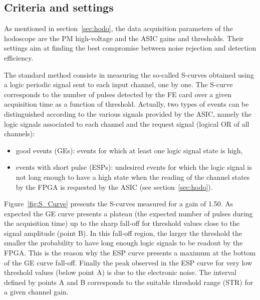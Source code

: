 \documentclass[a4paper,11pt]{article}
\begin{document}
\subsection{Criteria and settings}
\label{sec:Settings}

As mentioned in section~\ref{sec:hodo}, the data acquisition parameters of the hodoscope are the PM high-voltage and the ASIC gains and thresholds. Their settings aim at finding the best compromise between noise rejection and detection efficiency.

The standard method consists in measuring the so-called S-curves obtained using a logic periodic signal sent to each input channel, one by one. The S-curve corresponds to the number of pulses detected by the FE card over a given acquisition time as a function of threshold. Actually, two types of events can be distinguished according to the various signals provided by the ASIC, namely the logic signals associated to each channel and the request signal (logical OR of all channels):
\begin{itemize}
  \item good events (GEs): events for which at least one logic signal state is high, 
  \item events with short pulse (ESPs): undesired events for which the logic signal is not long enough to have a high state when the reading of the channel states by the FPGA is requested by the ASIC (see section~\ref{sec:hodo}).
\end{itemize}

Figure~\ref{fig:S_Curve} presents the S-curves measured for a gain of 1.50. As expected the GE curve presents a plateau (the expected number of pulses during the acquisition time) up to the sharp fall-off for threshold values close to the signal amplitude (point B). In this fall-off region, the larger the threshold the smaller the probability to have long enough logic signals to be readout by the FPGA. This is the reason why the ESP curve presents a maximum at the bottom of the GE curve fall-off. Finally the peak observed in the ESP curve for very low threshold values (below point A) is due to the electronic noise. The interval defined by points A and B corresponds to the suitable threshold range (STR) for a given channel gain.
\end{document}
